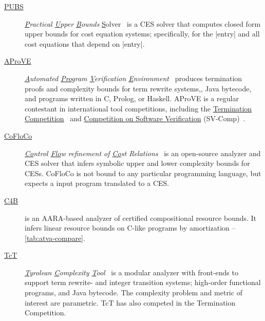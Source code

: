 \begin{description}

\item[\href{https://costa.fdi.ucm.es/~costa/pubs/pubs.php}{{PUBS}}]
      \emph{\underline{P}ractical \underline{U}pper \underline{B}ounds} \underline{S}olver~\cite{albert2010}
      is a CES solver that computes closed form upper bounds for cost equation systems;
      specifically, for the \pr|entry| and all cost equations that depend on \pr|entry|.

\item[\href{https://aprove.informatik.rwth-aachen.de}{{AProVE}}]
      \emph{\underline{A}utomated \underline{Pro}gram \underline{V}erification \underline{E}nvironment}~\cite{giesl2017}
      produces termination proofs and complexity bounds for
      term rewrite systems,,
      Java bytecode,
      and programs written in
      C,
      Prolog, or
      Haskell.
      AProVE is a regular contestant in international tool competitions, including the
      \href{https://termination-portal.org/wiki/Termination_Competition}{Termination Competition}~\cite{giesl2019}
      and \href{https://sv-comp.sosy-lab.org/}{Competition on Software Verification} (SV-Comp)~\cite{beyer2022}.

\item[\href{https://github.com/aeflores/CoFloCo}{{CoFloCo}}]
      \emph{\underline{Co}ntrol \underline{Flo}w refinement of \underline{Co}st Relations}~\cite{floresmontoya2014}
      is an open-source analyzer and CES solver that infers symbolic upper and lower complexity bounds for CESs.
      CoFloCo is not bound to any particular programming language, but expects a input program translated to a CES\@.

\item[\href{https://www.cs.yale.edu/homes/qcar/aaa/}{C4B}]\cite{carbonneaux2015}
      is an AARA-based analyzer of certified compositional resource bounds.
      It infers linear resource bounds on C-like programs by amortization -- \autoref{tab:atva-compare}.

\item[\href{http://cl-informatik.uibk.ac.at/software/tct/}{TcT}]
       \emph{\underline{T}yrolean \underline{C}omplexity \underline{T}ool}~\cite{avanzini2016}
       is a modular analyzer with front-ends to support term rewrite- and integer transition systems;
       high-order functional programs, and Java bytecode.
       The complexity problem and metric of interest are parametric.
       TcT has also competed in the Termination Competition.


\end{description}
